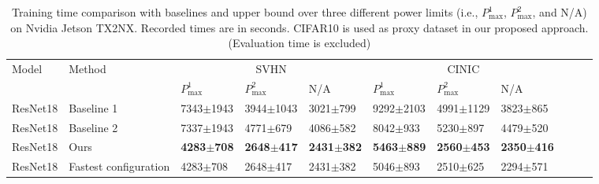 
\begin{table*}[tb!]
  \caption{Training time comparison with baselines and upper bound over three different power limits (i.e., $P_\text{{max}}^{1}$, $P_{\text{max}}^{2}$, and N/A) on Nvidia Jetson TX2NX. Recorded times are in seconds. CIFAR10 is used as proxy dataset in our proposed approach. (Evaluation time is excluded)}
  \label{table:comparison_with_baseline_tx2nx}
  \centering
  \begin{adjustbox}{width=\columnwidth,center}
  \begin{tabular}{lllllllllll}
    \toprule
    Model       & Method                & \multicolumn{3}{c}{SVHN}          & \multicolumn{3}{c}{CINIC} \\
    \cmidrule(r){3-5} \cmidrule(r){6-8}
                &                       & $P_\text{{max}}^{1}$ &$P_\text{{max}}^{2}$&N/A  &$P_{\text{max}}^{1}$&$P_{\text{max}}^{2}$& N/A \\
    \midrule
    ResNet18    & Baseline 1            &7343$\pm$1943  &3944$\pm$1043    &3021$\pm$799   &9292$\pm$2103   &4991$\pm$1129 &3823$\pm$865 \\
    ResNet18    & Baseline 2            &7337$\pm$1943 &4771$\pm$679    &4086$\pm$582   &8042$\pm$933    &5230$\pm$\phantom{0}897   &4479$\pm$520 \\
    ResNet18    & Ours                  &\textbf{4283$\pm$708}  &\textbf{2648$\pm$417}    &\textbf{2431$\pm$382}    &\textbf{5463$\pm$889}    &\textbf{2560$\pm$453}   &\textbf{2350$\pm$416}  \\
    ResNet18    & Fastest configuration &4283$\pm$708  &2648$\pm$417    &2431$\pm$382  &5046$\pm$893   &2510$\pm$\phantom{0}625   &2294$\pm$571  \\
    \bottomrule
  \end{tabular}
  \end{adjustbox}
\end{table*}